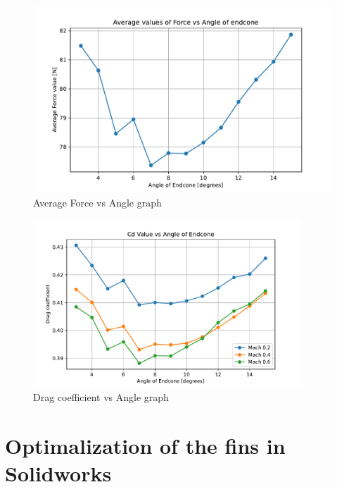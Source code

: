 \documentclass{article}
\begin{document}
\begin{figure}[H]
    \centering
    \includegraphics[width=\textwidth]{../data/R6-Parametric-Endcone/ForceVsAngle.pdf}
    \caption{Average Force vs Angle graph}
\end{figure}


\begin{figure}[H]
    \centering
    \includegraphics[width=0.9\textwidth]{../data/R6-Parametric-Endcone/CdVsAngle.pdf}
    \caption{Drag coefficient vs Angle graph}
\end{figure}



\newpage

\section{Optimalization of the fins in Solidworks}
\end{document}

